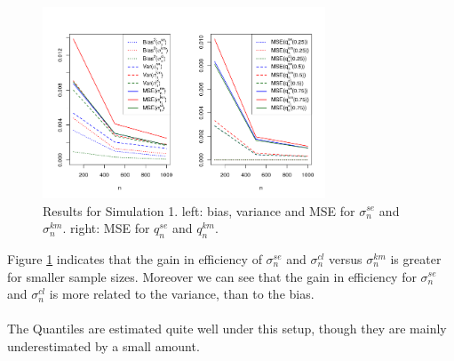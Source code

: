 \begin{figure}[h!]
	\begin{center}
		\includegraphics[width=0.75\textwidth]{./figures/expexp_mse2}
	\end{center}
	\caption{Results for Simulation 1. left: bias, variance and MSE for $\sigma_n^{se}$ and $\sigma_n^{km}$. right: MSE for $q_n^{se}$ and $q_n^{km}$.}
	\label{fig:mse_expexp}
\end{figure}
%
\clearpage
%
Figure \ref{fig:mse_expexp} indicates that the gain in efficiency of $\sigma_n^{se}$ and $\sigma_n^{cl}$ versus $\sigma_n^{km}$ is greater for smaller sample sizes. Moreover we can see that the gain in efficiency for $\sigma_{n}^{se}$ and $\sigma_n^{cl}$ is more related to the variance, than to the bias.\\
\\
The Quantiles are estimated quite well under this setup, though they are mainly underestimated by a small amount. 
%
